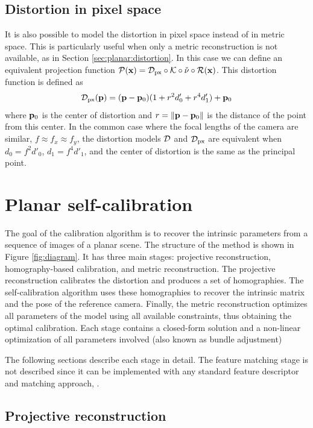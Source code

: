 \documentclass[10pt,twocolumn,letterpaper]{article}
\begin{document}
\subsection{Distortion in pixel space}

It is also possible to model the distortion in pixel space instead of in metric space. This is particularly useful when only a metric reconstruction is not available, as in Section \ref{sec:planar:distortion}. In this case we can define an equivalent projection function $\mathcal{P}(\mathbf{x}) = \mathcal{D}_{\text{px}} \circ \mathcal{K} \circ \check{\nu} \circ \mathcal{R}(\mathbf{x})$. This distortion function is defined as
%
\begin{align}
\mathcal{D}_{\text{px}}(\mathbf{p}) = (\mathbf{p} - \mathbf{p}_0)(1+r^2 d'_0 + r^4 d'_1) + \mathbf{p}_0
\label{eq:distortion_pixels}
\end{align}
%
where $\mathbf{p}_0$ is the center of distortion and $r=\lVert\mathbf{p}-\mathbf{p}_0\rVert$ is the distance of the point from this center. In the common case where the focal lengths of the camera are similar, \ie $f \approx f_x \approx f_y$, the distortion models $\mathcal{D}$ and $\mathcal{D}_{\text{px}}$ are equivalent when $d_0 = f^2 d'_0$, $d_1=f^4 d'_1$, and the center of distortion is the same as the principal point.

\section{Planar self-calibration}
The goal of the calibration algorithm is to recover the intrinsic parameters from a sequence of images of a planar scene. The structure of the method is shown in Figure \ref{fig:diagram}. It has three main stages: projective reconstruction, homography-based calibration, and metric reconstruction. The projective reconstruction calibrates the distortion and produces a set of homographies. The self-calibration algorithm uses these homographies to recover the intrinsic matrix and the pose of the reference camera. Finally, the metric reconstruction optimizes all parameters of the model using all available constraints, thus obtaining the optimal calibration. Each stage contains a closed-form solution and a non-linear optimization of all parameters involved (also known as bundle adjustment)

The following sections describe each stage in detail. The feature matching stage is not described since it can be implemented with any standard feature descriptor and matching approach, \eg \cite{rublee2011orb}.

\subsection{Projective reconstruction}
\end{document}
